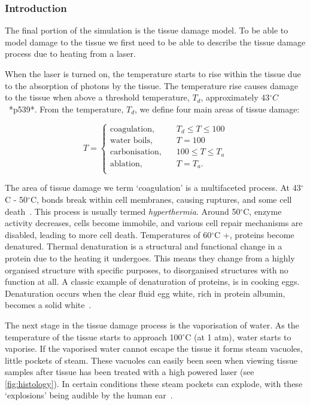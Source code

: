\subsubsection{Introduction}
The final portion of the simulation is the tissue damage model. To be able to model damage to the tissue we first need to be able to describe the tissue damage process due to heating from a laser.

When the laser is turned on, the temperature starts to rise within the tissue due to the absorption of photons by the tissue. The temperature rise causes damage to the tissue when above a threshold temperature, $T_d$, approximately 43$^{\circ}C$~\cite{welch2011optical}*p539*. From the temperature, $T_d$, we define four main areas of tissue damage:


\begin{equation}
T = 
     \begin{cases}
       \text{coagulation,} &\quad T_d\leq T \leq 100\\
       \text{water boils,} &\quad T=100\\
       \text{carbonisation,} &\quad 100 \leq T \leq T_a\\
       \text{ablation,} &\quad T=T_a.\\
     \end{cases}
\end{equation}


The area of tissue damage we term `coagulation' is a multifaceted process. At 43$^{\circ}$C - 50$^{\circ}$C, bonds break within cell membranes, causing ruptures, and some cell death~\cite{welch2011optical}. This process is usually termed \textit{hyperthermia}. Around 50$^{\circ}$C, enzyme activity decreases, cells become immobile, and various cell repair mechanisms are disabled, leading to more cell death. Temperatures of 60$^{\circ}$C +, proteins become denatured. Thermal denaturation is a structural and functional change in a protein due to the heating it undergoes. This means they change from a highly organised structure with specific purposes, to disorganised structures with no function at all.  A classic example of denaturation of proteins, is in cooking eggs. Denaturation occurs when the clear fluid egg white, rich in protein albumin, becomes a solid white~\cite{niemz2013laser}.

The next stage in the tissue damage process is the vaporisation of water. As the temperature of the tissue starts to approach 100${^{\circ}}$C (at 1 atm), water starts to vaporise. If the vaporised water cannot escape the tissue it forms steam vacuoles, little pockets of steam. These vacuoles can easily been seen when viewing tissue samples after tissue has been treated with a high powered laser (see \cref{fig:histology}). In certain conditions these steam pockets can explode, with these `explosions' being audible by the human ear~\cite{petrella2013popcorn}.


